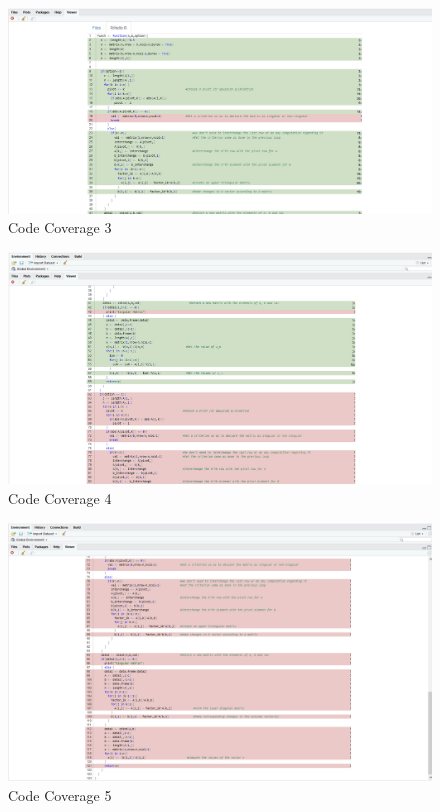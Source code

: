 \documentclass[12pt, titlepage]{article}
\begin{document}
\begin{figure}[H]
\centering
 \includegraphics[width=150mm]{CV1}
  \caption{Code Coverage 3}
  \label{fig:CV1}
\end{figure}

\begin{figure}[H]
\centering
 \includegraphics[width=150mm]{CV2}
  \caption{Code Coverage 4}
  \label{fig:CV2}
\end{figure}

\begin{figure}[H]
\centering
 \includegraphics[width=150mm]{CV3}
  \caption{Code Coverage 5}
  \label{fig:CV3}
\end{figure}
\end{document}
